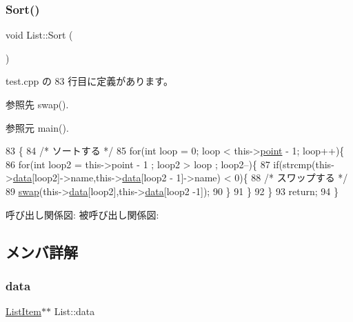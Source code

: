 \subsubsection{\texorpdfstring{Sort()}{Sort()}}
{\footnotesize\ttfamily void List\+::\+Sort (\begin{DoxyParamCaption}{ }\end{DoxyParamCaption})\hspace{0.3cm}{\ttfamily [inline]}}



 test.\+cpp の 83 行目に定義があります。



参照先 swap().



参照元 main().


\begin{DoxyCode}
83                \{
84         \textcolor{comment}{/* ソートする */}
85         \textcolor{keywordflow}{for}(\textcolor{keywordtype}{int} loop = 0; loop < this->\hyperlink{class_list_ab03801c8c3765b381b45a306d34f5daa}{point} - 1; loop++)\{
86             \textcolor{keywordflow}{for}(\textcolor{keywordtype}{int} loop2 = this->point - 1 ; loop2 > loop ; loop2--)\{
87                 \textcolor{keywordflow}{if}(strcmp(this->\hyperlink{class_list_a0fd821411e5922f1733b2afe207f6b28}{data}[loop2]->name,this->\hyperlink{class_list_a0fd821411e5922f1733b2afe207f6b28}{data}[loop2 - 1]->name) < 0)\{
88                     \textcolor{comment}{/* スワップする */}
89                     \hyperlink{test_8cpp_add33a83c7b2de277d5846db56efc6dae}{swap}(this->\hyperlink{class_list_a0fd821411e5922f1733b2afe207f6b28}{data}[loop2],this->\hyperlink{class_list_a0fd821411e5922f1733b2afe207f6b28}{data}[loop2 -1]);
90                 \}
91             \}
92         \}
93         \textcolor{keywordflow}{return};
94     \}
\end{DoxyCode}
呼び出し関係図\+:
被呼び出し関係図\+:


\subsection{メンバ詳解}
\mbox{\label{class_list_a0fd821411e5922f1733b2afe207f6b28}} 
\subsubsection{\texorpdfstring{data}{data}}
{\footnotesize\ttfamily \hyperlink{class_list_item}{List\+Item}$\ast$$\ast$ List\+::data\hspace{0.3cm}{\ttfamily [private]}}



